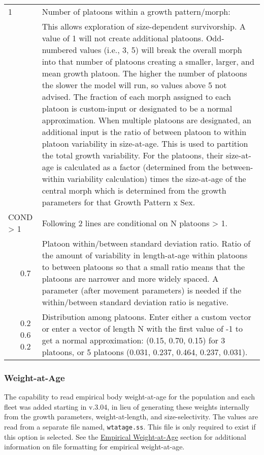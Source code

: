\begin{center}
\begin{longtable}{p{0.5cm} p{2cm} p{12.5cm}}
		\hline
		1 & & Number of platoons within a growth pattern/morph: \Tstrut\\
		& & This allows exploration of size-dependent survivorship. A value of 1 will not create additional platoons. Odd-numbered values (i.e., 3, 5) will break the overall morph into that number of platoons creating a smaller, larger, and mean growth platoon. The higher the number of platoons the slower the model will run, so values above 5 not advised. The fraction of each morph assigned to each platoon is custom-input or designated to be a normal approximation. When multiple platoons are designated, an additional input is the ratio of between platoon to within platoon variability in size-at-age. This is used to partition the total growth variability. For the platoons, their size-at-age is calculated as a factor (determined from the between-within variability calculation) times the size-at-age of the central morph which is determined from the growth parameters for that Growth Pattern x Sex. \Bstrut\\

		\multicolumn{2}{l}{COND > 1} & \multicolumn{1}{l}{\parbox{12cm}{Following 2 lines are conditional on N platoons > 1.}} \Tstrut\Bstrut\\

		& 0.7 & Platoon within/between standard deviation ratio. Ratio of the amount of variability in length-at-age within platoons to between platoons so that a small ratio means that the platoons are narrower and more widely spaced. A parameter (after movement parameters) is needed if the within/between standard deviation ratio is negative. \Bstrut\\

		& 0.2 0.6 0.2 & Distribution among platoons. Enter either a custom vector or enter a vector of length N with the first value of -1 to get a normal approximation: (0.15, 0.70, 0.15) for 3 platoons, or 5 platoons (0.031, 0.237, 0.464, 0.237, 0.031). \Bstrut\\
		\hline
	\end{longtable}
	\vspace*{-\baselineskip}
\end{center}

\subsubsection{Weight-at-Age}
The capability to read empirical body weight-at-age for the population and each fleet was added starting in v.3.04, in lieu of generating these weights internally from the growth parameters, weight-at-length, and size-selectivity. The values are read from a separate file named, \verb|wtatage.ss|. This file is only required to exist if this option is selected. See the \hyperlink{WAA}{Empirical Weight-at-Age} section for additional information on file formatting for empirical weight-at-age.

